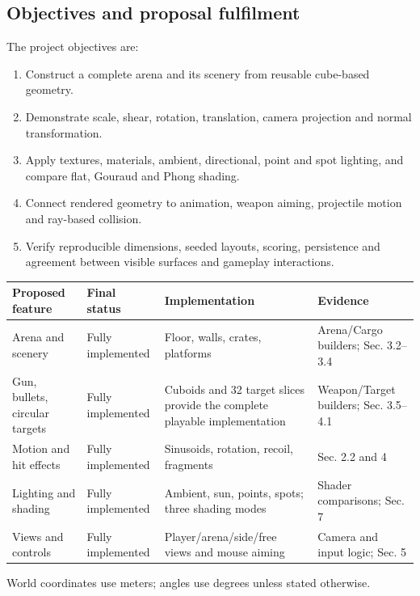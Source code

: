 \subsection{Objectives and proposal fulfilment}
The project objectives are:
\begin{enumerate}
\item Construct a complete arena and its scenery from reusable cube-based geometry.
\item Demonstrate scale, shear, rotation, translation, camera projection and normal transformation.
\item Apply textures, materials, ambient, directional, point and spot lighting, and compare flat, Gouraud and Phong shading.
\item Connect rendered geometry to animation, weapon aiming, projectile motion and ray-based collision.
\item Verify reproducible dimensions, seeded layouts, scoring, persistence and agreement between visible surfaces and gameplay interactions.
\end{enumerate}
\begin{center}\begin{tabularx}{\linewidth}{L{.20\linewidth}L{.20\linewidth}XX}\toprule
Proposed feature & Final status & Implementation & Evidence \\\midrule
Arena and scenery & Fully implemented & Floor, walls, crates, platforms & Arena/Cargo builders; Sec. 3.2--3.4\\
Gun, bullets, circular targets & Fully implemented & Cuboids and 32 target slices provide the complete playable implementation & Weapon/Target builders; Sec. 3.5--4.1\\
Motion and hit effects & Fully implemented & Sinusoids, rotation, recoil, fragments & Sec. 2.2 and 4\\
Lighting and shading & Fully implemented & Ambient, sun, points, spots; three shading modes & Shader comparisons; Sec. 7\\
Views and controls & Fully implemented & Player/arena/side/free views and mouse aiming & Camera and input logic; Sec. 5\\\bottomrule
\end{tabularx}\end{center}

World coordinates use meters; angles use degrees unless stated otherwise.
